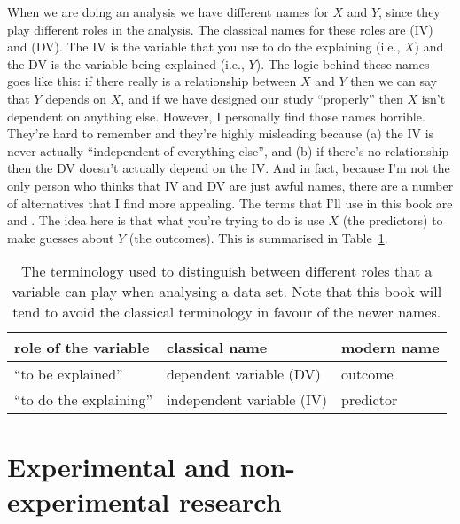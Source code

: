 When we are doing an analysis we have different names for $X$ and $Y$, since they play different roles in the analysis. The classical names for these roles are  (IV) and  (DV). The IV is the variable that you use to do the explaining (i.e., $X$) and the DV is the variable being explained (i.e., $Y$). The logic behind these names goes like this: if there really is a relationship between $X$ and $Y$ then we can say that $Y$ depends on $X$, and if we have designed our study ``properly'' then $X$ isn't dependent on anything else. However, I personally find those names horrible. They're hard to remember and they're highly misleading because (a) the IV is never actually ``independent of everything else'', and (b) if there's no relationship then the DV doesn't actually depend on the IV. And in fact, because I'm not the only person who thinks that IV and DV are just awful names, there are a number of alternatives that I find more appealing. The terms that I'll use in this book are  and . The idea here is that what you're trying to do is use $X$ (the predictors) to make guesses about $Y$ (the outcomes). This is summarised in Table~\ref{tab:ivdv}.

\begin{table}
\caption{The terminology used to distinguish between different roles that a variable can play when analysing a data set. Note that this book will tend to avoid the classical terminology in favour of the newer names.} \label{tab:ivdv}
\tabcapsep
\begin{center}
\begin{tabular}{lll}
\hline
role of the variable     & classical name            & modern name  \\
\hline
``to be explained''      & dependent variable (DV)   & outcome      \\
``to do the explaining'' & independent variable (IV) & predictor    \\
\hline
\end{tabular} 
\end{center}
\end{table}


\section{Experimental and non-experimental research~\label{sec:researchdesigns}}

